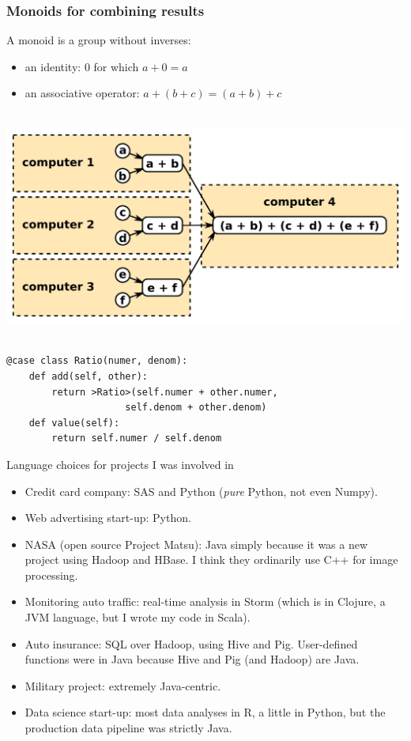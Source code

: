 \documentclass{beamer}
\begin{document}
\begin{frame}[fragile]
\frametitle{Monoids for combining results}

A monoid is a group without inverses:
\begin{itemize}
\item an identity: $0$ for which $a + 0 = a$
\item an associative operator: $a + (b + c) = (a + b) + c$
\end{itemize}

\vspace{0.2 cm}
\mbox{ } \hfill \includegraphics[width=0.7\linewidth]{monoids.png} \hfill \mbox{ }

\vspace{0.2 cm}
\begin{lstlisting}
@case class Ratio(numer, denom):
    def add(self, other):
        return >Ratio>(self.numer + other.numer,
                     self.denom + other.denom)
    def value(self):
        return self.numer / self.denom
\end{lstlisting}
\end{frame}

\begin{frame}{Language choices for projects I was involved in}
\begin{itemize}
\item Credit card company: SAS and Python ({\it pure} Python, not even Numpy).

\item Web advertising start-up: Python.

\item NASA (open source Project Matsu): Java simply because it was a new project using Hadoop and HBase. I think they ordinarily use C++ for image processing.

\item Monitoring auto traffic: real-time analysis in Storm (which is in Clojure, a JVM language, but I wrote my code in Scala).

\item Auto insurance: SQL over Hadoop, using Hive and Pig. User-defined functions were in Java because Hive and Pig (and Hadoop) are Java.

\item Military project: extremely Java-centric.

\item Data science start-up: most data analyses in R, a little in Python, but the production data pipeline was strictly Java.
\end{itemize}
\end{frame}
\end{document}
